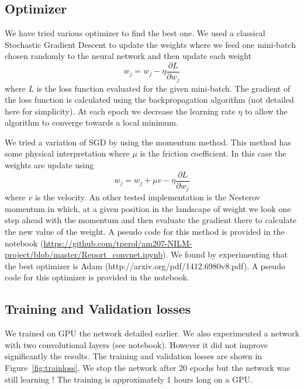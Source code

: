 \documentclass[11pt]{article}
\begin{document}
\subsection{Optimizer} 

We have tried various optimizer to find the best one. We used a classical Stochastic Gradient Descent to update the weights where we feed one mini-batch chosen randomly to the neural network and then update each weight
\begin{equation}
	w_j = w_j - \eta \frac{\partial L}{\partial w_j}
\end{equation}
where $L$ is the loss function evaluated for the given mini-batch. The gradient of the loss function is calculated using the backpropagation algorithm (not detailed here for simplicity). At each epoch we decrease the learning rate $\eta$ to allow the algorithm to converge towards a local minimum.

We tried a variation of SGD by using the momentum method. This method has some physical interpretation where $\mu$ is the friction coefficient. In this case the weights are update using
\begin{equation}
	w_j = w_j + \mu v - \eta \frac{\partial L}{\partial w_j}
\end{equation}
where $v$ is the velocity. An other tested implementation is the Nesterov momentum in which, at a given position in the landscape of weight we look one step ahead with the momentum and then evaluate the gradient there to calculate the new value of the weight. A pseudo code for this method is provided in the notebook (\url{https://github.com/tperol/am207-NILM-project/blob/master/Report_convnet.ipynb}). We found by experimenting that the best optimizer is Adam (http://arxiv.org/pdf/1412.6980v8.pdf). A pseudo code for this optimizer is provided in the notebook.

\subsection{Training and Validation losses}
We trained on GPU the network detailed earlier. We also experimented a network with two convolutional layers (see notebook). However it did not improve significantly the results. The training and validation losses are shown in Figure~\ref{fig:trainloss}. We stop the network after 20 epochs but the network was still learning ! The training is approximately 1 hours long on a GPU.
\end{document}
